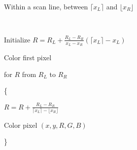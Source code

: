 \documentclass[12pt]{article}
\begin{document}
\begin{spacing}{1.2}
\

Within a scan line, between $\lceil x_L \rceil$ and $\lfloor  x_R \rfloor$

\



\qquad Initialize $\displaystyle R = R_L + \frac{R_L - R_R}{x_L - x_R} \left( \lceil x_L \rceil - x_L \right)$

\qquad Color first pixel

\qquad for $R$ from $R_L$ to $R_R$

\qquad \{

\qquad \qquad $\displaystyle R = R + \frac{R_L - R_R}{\lceil x_L \rceil - \lfloor x_R \rfloor } $

\qquad {}

\qquad \qquad Color pixel $(x, y, R, G, B)$

\qquad \}

\end{spacing}
\end{document}
